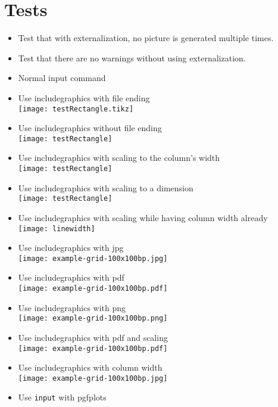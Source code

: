 \documentclass[twocolumn]{article}
\begin{document}
	\section*{Tests}
	\begin{itemize}
		\item Test that with externalization, no picture is generated multiple times.
		\item Test that there are no warnings without using externalization.
		\item Normal input command\\%
		\item Use includegraphics with file ending\\%
			\texttt{[image: testRectangle.tikz]}%
		\item Use includegraphics without file ending\\%
			\texttt{[image: testRectangle]}%
		\item Use includegraphics with scaling to the column's width\\%
			\texttt{[image: testRectangle]}%
		\item Use includegraphics with scaling to a dimension\\%
			\texttt{[image: testRectangle]}%
		\item Use includegraphics with scaling while having column width already\\%
			\texttt{[image: linewidth]}%
		\item Use includegraphics with jpg\\%
			\texttt{[image: example-grid-100x100bp.jpg]}%
		\item Use includegraphics with pdf\\%
			\texttt{[image: example-grid-100x100bp.pdf]}%
		\item Use includegraphics with png\\%
			\texttt{[image: example-grid-100x100bp.png]}%
		\item Use includegraphics with pdf and scaling\\%
			\texttt{[image: example-grid-100x100bp.pdf]}%
		\item Use includegraphics with column width\\%
			\texttt{[image: example-grid-100x100bp.jpg]}%
		\item Use \texttt{input} with pgfplots\\%

\end{itemize}
\end{document}
